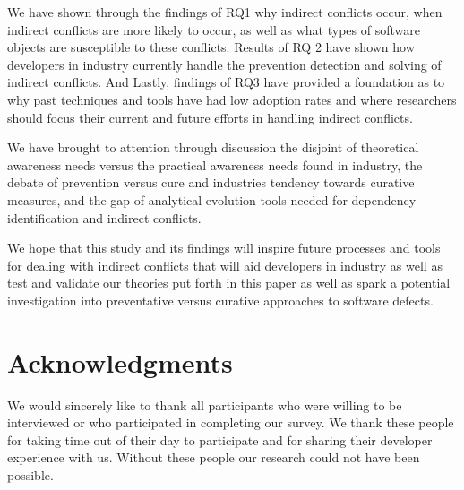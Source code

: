 \documentclass[conference]{IEEEtran}
\begin{document}
We have shown through the findings of RQ1 why indirect conflicts occur, when indirect conflicts are more likely to
occur, as well as what types of software objects are susceptible to these conflicts. Results of RQ 2 have shown
how developers in industry currently handle the prevention detection and solving of indirect conflicts. And Lastly, findings of RQ3
have provided a foundation as to why past techniques and tools have had low adoption rates and where
researchers should focus their current and future efforts in handling indirect conflicts. 

We have brought to attention through discussion the disjoint of theoretical awareness needs versus the practical
awareness needs found in industry, the debate of prevention versus cure and industries tendency towards curative measures,
and the gap of analytical evolution tools needed for dependency identification and indirect conflicts.

We hope that this study and its 
findings will inspire future processes and tools for dealing with indirect conflicts that 
will aid developers in industry as well as test and validate our theories put forth in this paper as well as spark a potential
investigation into preventative versus curative approaches to software defects.

\section{Acknowledgments}

We would sincerely like to thank all participants who were willing to be interviewed or who participated
in completing our survey. We thank these people for taking time out of their day to participate and for
sharing their developer experience with us. Without these people our research could not have been possible.




\end{document}
